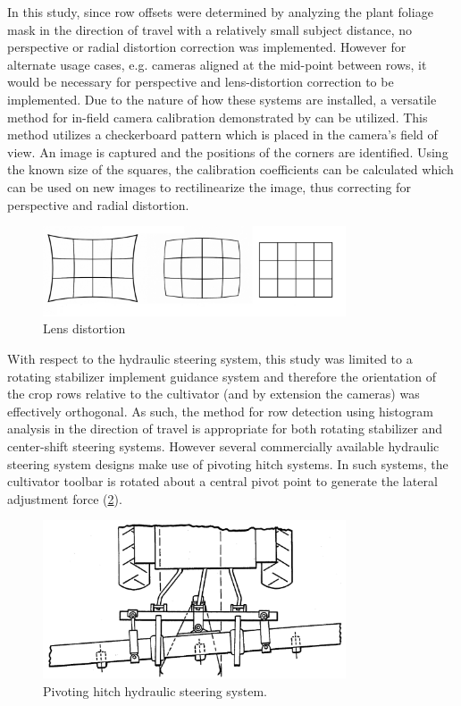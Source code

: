\documentclass[authoryear]{elsarticle}
\begin{document}
In this study, since row offsets were determined by analyzing the
plant foliage mask in the direction of travel with a relatively small
subject distance, no perspective or radial distortion correction was
implemented. However for alternate 
usage cases, e.g. cameras aligned at the mid-point between rows, it
would be necessary for perspective and lens-distortion correction to
be implemented. Due to the nature of how these systems are installed,
a versatile method for in-field camera calibration demonstrated by
\citet{lee2002} can be utilized. This method utilizes a
checkerboard pattern which is placed in the camera’s field of view. An
image is captured and the positions of the corners are
identified. Using the known size of the squares, the calibration
coefficients can be calculated which can be used on new images to
rectilinearize the image, thus correcting for perspective and radial
distortion.

\begin{figure}
  \centering
  \includegraphics[width=0.8\textwidth,natwidth=610,natheight=642]{lens_distortion.jpg}
  \caption{Lens distortion}
  \label{fig:distortion}
\end{figure}

With respect to the hydraulic steering system, this study was limited
to a rotating stabilizer implement guidance system
and therefore the orientation of the crop rows relative to the
cultivator (and by extension the cameras) was effectively
orthogonal. As such, the method for row detection using histogram
analysis in the direction of travel is appropriate for both rotating
stabilizer and center-shift steering systems. However several
commercially available hydraulic steering system designs make use of
pivoting hitch systems. In such systems, the cultivator toolbar is
rotated about a central pivot point to generate the lateral adjustment
force (\ref{fig:pivoting_hitch}).

\begin{figure}
  \centering
  \includegraphics[width=0.8\textwidth,natwidth=610,natheight=642]{pivoting_hitch.png}
  \caption{Pivoting hitch hydraulic steering system.}
  \label{fig:pivoting_hitch}
\end{figure}
\end{document}
